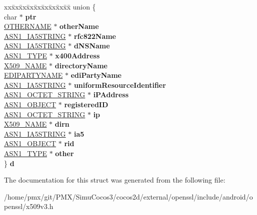 \begin{DoxyCompactItemize}
\begin{tabbing}
\end{tabbing}\item 
\mbox{\label{structGENERAL__NAME__st_a71903714c03a33ee79f335b34550027a}} 
\begin{tabbing}
xx\=xx\=xx\=xx\=xx\=xx\=xx\=xx\=xx\=\kill
union \{\\
\>char $\ast$ {\bfseries ptr}\\
\>\hyperlink{structotherName__st}{OTHERNAME} $\ast$ {\bfseries otherName}\\
\>\hyperlink{structasn1__string__st}{ASN1\_IA5STRING} $\ast$ {\bfseries rfc822Name}\\
\>\hyperlink{structasn1__string__st}{ASN1\_IA5STRING} $\ast$ {\bfseries dNSName}\\
\>\hyperlink{structasn1__type__st}{ASN1\_TYPE} $\ast$ {\bfseries x400Address}\\
\>\hyperlink{structX509__name__st}{X509\_NAME} $\ast$ {\bfseries directoryName}\\
\>\hyperlink{structEDIPartyName__st}{EDIPARTYNAME} $\ast$ {\bfseries ediPartyName}\\
\>\hyperlink{structasn1__string__st}{ASN1\_IA5STRING} $\ast$ {\bfseries uniformResourceIdentifier}\\
\>\hyperlink{structasn1__string__st}{ASN1\_OCTET\_STRING} $\ast$ {\bfseries iPAddress}\\
\>\hyperlink{structasn1__object__st}{ASN1\_OBJECT} $\ast$ {\bfseries registeredID}\\
\>\hyperlink{structasn1__string__st}{ASN1\_OCTET\_STRING} $\ast$ {\bfseries ip}\\
\>\hyperlink{structX509__name__st}{X509\_NAME} $\ast$ {\bfseries dirn}\\
\>\hyperlink{structasn1__string__st}{ASN1\_IA5STRING} $\ast$ {\bfseries ia5}\\
\>\hyperlink{structasn1__object__st}{ASN1\_OBJECT} $\ast$ {\bfseries rid}\\
\>\hyperlink{structasn1__type__st}{ASN1\_TYPE} $\ast$ {\bfseries other}\\
\} {\bfseries d}\\

\end{tabbing}\end{DoxyCompactItemize}


The documentation for this struct was generated from the following file\+:\begin{DoxyCompactItemize}
\item 
/home/pmx/git/\+P\+M\+X/\+Simu\+Cocos3/cocos2d/external/openssl/include/android/openssl/x509v3.\+h\end{DoxyCompactItemize}
